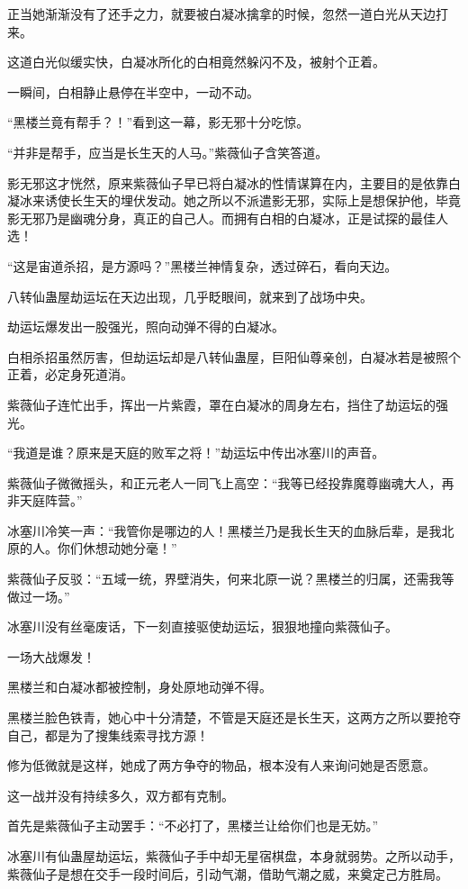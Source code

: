 \begin{this_body}
正当她渐渐没有了还手之力，就要被白凝冰擒拿的时候，忽然一道白光从天边打来。

这道白光似缓实快，白凝冰所化的白相竟然躲闪不及，被射个正着。

一瞬间，白相静止悬停在半空中，一动不动。

“黑楼兰竟有帮手？！”看到这一幕，影无邪十分吃惊。

“并非是帮手，应当是长生天的人马。”紫薇仙子含笑答道。

影无邪这才恍然，原来紫薇仙子早已将白凝冰的性情谋算在内，主要目的是依靠白凝冰来诱使长生天的埋伏发动。她之所以不派遣影无邪，实际上是想保护他，毕竟影无邪乃是幽魂分身，真正的自己人。而拥有白相的白凝冰，正是试探的最佳人选！

“这是宙道杀招，是方源吗？”黑楼兰神情复杂，透过碎石，看向天边。

八转仙蛊屋劫运坛在天边出现，几乎眨眼间，就来到了战场中央。

劫运坛爆发出一股强光，照向动弹不得的白凝冰。

白相杀招虽然厉害，但劫运坛却是八转仙蛊屋，巨阳仙尊亲创，白凝冰若是被照个正着，必定身死道消。

紫薇仙子连忙出手，挥出一片紫霞，罩在白凝冰的周身左右，挡住了劫运坛的强光。

“我道是谁？原来是天庭的败军之将！”劫运坛中传出冰塞川的声音。

紫薇仙子微微摇头，和正元老人一同飞上高空：“我等已经投靠魔尊幽魂大人，再非天庭阵营。”

冰塞川冷笑一声：“我管你是哪边的人！黑楼兰乃是我长生天的血脉后辈，是我北原的人。你们休想动她分毫！”

紫薇仙子反驳：“五域一统，界壁消失，何来北原一说？黑楼兰的归属，还需我等做过一场。”

冰塞川没有丝毫废话，下一刻直接驱使劫运坛，狠狠地撞向紫薇仙子。

一场大战爆发！

黑楼兰和白凝冰都被控制，身处原地动弹不得。

黑楼兰脸色铁青，她心中十分清楚，不管是天庭还是长生天，这两方之所以要抢夺自己，都是为了搜集线索寻找方源！

修为低微就是这样，她成了两方争夺的物品，根本没有人来询问她是否愿意。

这一战并没有持续多久，双方都有克制。

首先是紫薇仙子主动罢手：“不必打了，黑楼兰让给你们也是无妨。”

冰塞川有仙蛊屋劫运坛，紫薇仙子手中却无星宿棋盘，本身就弱势。之所以动手，紫薇仙子是想在交手一段时间后，引动气潮，借助气潮之威，来奠定己方胜局。


\end{this_body}

